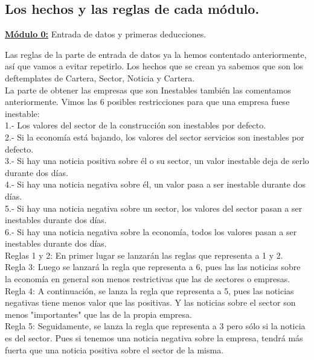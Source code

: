 \documentclass[12pt]{article}
\begin{document}
\subsection{Los hechos y las reglas de cada módulo.}
\begin{center}
	\underline{\textbf{Módulo 0:}} Entrada de datos y primeras deducciones.
\end{center}
Las reglas de la parte de entrada de datos ya la hemos contentado anteriormente, así que vamos a evitar repetirlo. Los hechos que se crean ya sabemos que son los deftemplates de Cartera, Sector, Noticia y Cartera.\\
 
La parte de obtener las empresas que son Inestables también las comentamos anteriormente. Vimos las 6 posibles restricciones para que una empresa fuese inestable:\\
1.- Los valores del sector de la construcción son inestables por defecto.\\
2.- Si la economía está bajando, los valores del sector servicios son inestables por defecto.\\
3.- Si hay una noticia positiva sobre él o su sector, un valor inestable deja de serlo durante dos días.\\
4.- Si hay una noticia negativa sobre él, un valor pasa a ser inestable durante dos días.\\
5.- Si hay una noticia negativa sobre un sector, los valores del sector pasan a ser inestables durante dos días.\\
6.- Si hay una noticia negativa sobre la economía, todos los valores pasan a ser inestables durante dos días.\\ 

Reglas 1 y 2: En primer lugar se lanzarán las reglas que representa a 1 y 2.\\

Regla 3: Luego se lanzará la regla que representa a 6, pues las las noticias sobre la economía en general son menos restrictivas que las de sectores o empresas. \\

Regla 4: A continuación, se lanza la regla que representa a 5, pues las noticias negativas tiene menos valor que las positivas. Y las noticias sobre el sector son menos "importantes" que las de la propia empresa. \\

Regla 5: Seguidamente, se lanza la regla que representa a 3 pero sólo si la noticia es del sector. Pues si tenemos una noticia negativa sobre la empresa, tendrá más fuerta que una noticia positiva sobre el sector de la misma. \\
\end{document}
